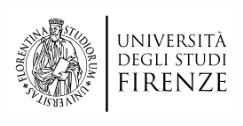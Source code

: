 \documentclass[11pt, a4paper]{book}%
\numberwithin{equation}{section}
\begin{document}

\cleardoublepage
\graphicspath{{img/}}
\thispagestyle{empty}

\begin{figure}[h]
\centering
\includegraphics[width=6cm]{LOGOUNIFI}
\label{fig:UniFI}
\end{figure}
\end{document}
